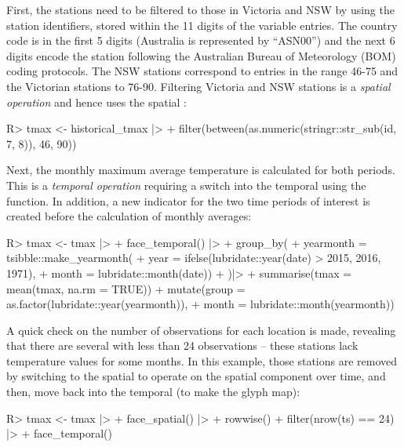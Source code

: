 \documentclass[
]{jss}
\begin{document}
First, the stations need to be filtered to those in Victoria and NSW by
using the station identifiers, stored within the 11 digits of the
 variable entries. The country code is in the first 5 digits
(Australia is represented by ``ASN00'') and the next 6 digits encode the
station following the Australian Bureau of Meteorology (BOM) \citep{bom}
coding protocols. The NSW stations correspond to entries in the range
46-75 and the Victorian stations to 76-90. Filtering Victoria and NSW
stations is a \emph{spatial operation} and hence uses the spatial
:

\begin{CodeChunk}
\begin{CodeInput}
R> tmax <- historical_tmax |>
+   filter(between(as.numeric(stringr::str_sub(id, 7, 8)), 46, 90))
\end{CodeInput}
\end{CodeChunk}

Next, the monthly maximum average temperature is calculated for both
periods. This is a \emph{temporal operation} requiring a switch into the
temporal  using the  function. In
addition, a new indicator for the two time periods of interest is
created before the calculation of monthly averages:

\begin{CodeChunk}
\begin{CodeInput}
R> tmax <- tmax |>
+   face_temporal() |> 
+   group_by(
+     yearmonth = tsibble::make_yearmonth(
+       year = ifelse(lubridate::year(date) > 2015, 2016, 1971),
+       month = lubridate::month(date))
+       )|>
+   summarise(tmax = mean(tmax, na.rm = TRUE)) %
+   mutate(group = as.factor(lubridate::year(yearmonth)),
+          month = lubridate::month(yearmonth))
\end{CodeInput}
\end{CodeChunk}

A quick check on the number of observations for each location is made,
revealing that there are several with less than 24 observations -- these
stations lack temperature values for some months. In this example, those
stations are removed by switching to the spatial  to
operate on the spatial component over time, and then, move back into the
temporal  (to make the glyph map):

\begin{CodeChunk}
\begin{CodeInput}
R> tmax <- tmax |> 
+   face_spatial() |> 
+   rowwise() %
+   filter(nrow(ts) == 24) |>
+   face_temporal()
\end{CodeInput}
\end{CodeChunk}
\end{document}
